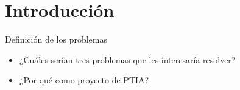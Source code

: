 \section{Introducción}

\begin{tcolorbox}[colback=yellow!10!white,colframe=red!75!black,title=Recomendaciones]
  Definición de los problemas
  \begin{itemize}
      \item ¿Cuáles serían tres problemas que les interesaría resolver?
      \item ¿Por qué como proyecto de PTIA?
  \end{itemize}
\end{tcolorbox}

\pagebreak